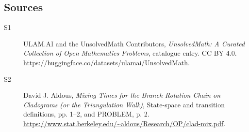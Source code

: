 \documentclass[11pt]{article}
\begin{document}
\subsection{Sources}
\begin{description}
\item[\hypertarget{source:statement:1}{S1}] ULAM.AI and the UnsolvedMath Contributors, \emph{UnsolvedMath: A Curated Collection of Open Mathematics Problems}, catalogue entry. CC BY 4.0. \url{https://huggingface.co/datasets/ulamai/UnsolvedMath}.
\item[\hypertarget{source:statement:2}{S2}] David J. Aldous, \emph{Mixing Times for the Branch-Rotation Chain on Cladograms (or the Triangulation Walk)}, State-space and transition definitions, pp. 1--2, and PROBLEM, p. 2. \url{https://www.stat.berkeley.edu/~aldous/Research/OP/clad-mix.pdf}.
\end{description}
\label{end:statement}
\end{document}
